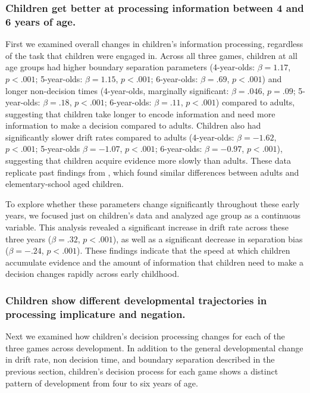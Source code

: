 \documentclass[10pt,letterpaper]{article}
\begin{document}
\subsubsection{Children get better at processing information between 4 and 6 years of age.}

First we examined overall changes in children's information processing, regardless of the task that children were engaged in. Across all three games, children at all age groups had higher boundary separation parameters (4-year-olds: $\beta = 1.17$, $p <.001$; 5-year-olds: $\beta = 1.15$, $p <.001$; 6-year-olds: $\beta = .69$, $p <.001$) and longer non-decision times (4-year-olds, marginally significant: $\beta = .046$, $p = .09$; 5-year-olds: $\beta = .18$, $p <.001$; 6-year-olds: $\beta = .11$, $p <.001$) compared to adults, suggesting that children take longer to encode information and need more information to make a decision compared to adults.  Children also had significantly slower drift rates compared to adults (4-year-olds: $\beta = -1.62$, $p <.001$; 5-year-olds $\beta = -1.07$, $p <.001$; 6-year-olds: $\beta = -0.97$, $p <.001$), suggesting that children acquire evidence more slowly than adults.  These data replicate past findings from , which found similar differences between adults and elementary-school aged children.  

To explore whether these parameters change significantly throughout these early years, we focused just on children's data and analyzed age group as a continuous variable.  This analysis revealed a significant increase in drift rate across these three years ($\beta = .32$, $p < .001$), as well as a significant decrease in separation bias ($\beta = -.24$, $p < .001$).  These findings indicate that the speed at which children accumulate evidence and the amount of information that children need to make a decision changes rapidly across early childhood.  

\subsubsection{Children show different developmental trajectories in processing implicature and negation.}

Next we examined how children's decision processing changes for each of the three games across development.  In addition to the general developmental change in drift rate, non decision time, and boundary separation described in the previous section, children's decision process for each game shows a distinct pattern of development from four to six years of age.  
\end{document}
